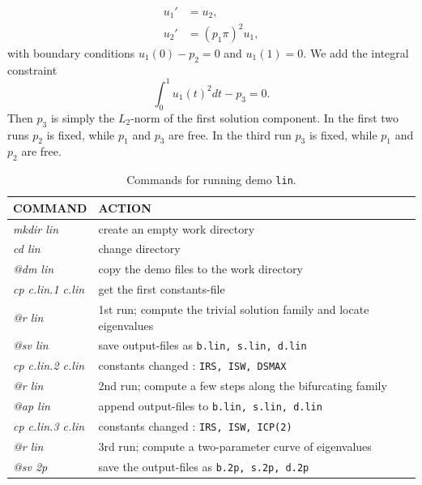 \documentclass[12pt]{report}
\begin{document}
\begin{equation} \begin{array}{cl}
  u_1 ' &= u_2  ,  \\
  u_2 ' &= (p_1 \pi)^{2} u_1 , \end{array} \end{equation}
with boundary conditions $ u_1(0)-p_2=0 $ and $  u_1(1)=0.$
We add the integral constraint
 $$ \int_0^{1} u_1(t)^{2} dt - p_3 = 0. $$
Then $p_3$ is simply the $L_2$-norm of the first solution component.
In the first two runs $p_2$ is fixed, while $p_1$ and $p_3$ are free.
In the third run  $p_3$ is fixed, while $p_1$ and $p_2$ are free.

\begin{table}[htbp]
\begin{center}
\begin{tabular}{| l | l |}
\hline
  COMMAND  & ACTION \\
\hline
  {\it mkdir lin} & create an empty work directory \\ 
  {\it cd lin} & change directory \\
  {\it @dm lin} & copy the demo files to the work directory \\
\hline
  {\it cp c.lin.1 c.lin} & get the first constants-file \\ 
  {\it @r lin} & 1st run; compute the trivial solution family and locate eigenvalues \\ 
  {\it @sv lin} & save output-files as {\tt b.lin, s.lin, d.lin} \\ 
\hline
  {\it cp c.lin.2 c.lin} & constants changed : {\tt IRS, ISW, DSMAX} \\ 
  {\it @r lin} & 2nd run; compute a few steps along the bifurcating family \\ 
  {\it @ap lin} & append output-files to {\tt b.lin, s.lin, d.lin} \\ 
\hline
  {\it cp c.lin.3 c.lin} & constants changed : {\tt IRS, ISW, ICP(2)} \\ 
  {\it @r lin} & 3rd run; compute a two-parameter curve of eigenvalues \\ 
  {\it @sv 2p} & save the output-files as {\tt b.2p, s.2p, d.2p} \\ 
\hline
\end{tabular}
\caption{Commands for running demo {\tt lin}.}
\label{tbl:demo_lin}
\end{center}
\end{table}
\end{document}
